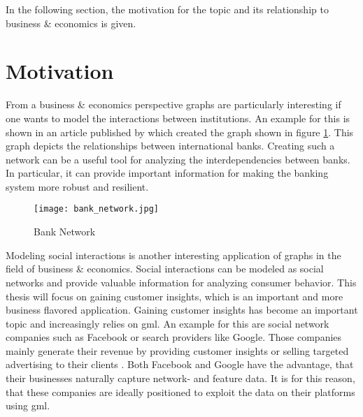 	\noindent In the following section, the motivation for the topic and its
	relationship to business \& economics is given. 

	\section{Motivation}

	\noindent From a business \& economics perspective graphs are particularly
	interesting if one wants to model the interactions between institutions. An 
	example for this is shown in an article published by 
	\cite{schweitzer2009economic} which created the graph shown in figure
	\ref{fig:bank_network}. This graph depicts the relationships between 
	international banks. Creating such a network can be a useful tool for 
	analyzing the interdependencies between banks. In particular, it can 
	provide important information for making the banking system more robust and 
	resilient. 

	\begin{figure}[h]
		\centering
		\texttt{[image: bank\_network.jpg]}
		\caption{Bank Network}
		\cite[p. 424]{schweitzer2009economic}
		\label{fig:bank_network}
	\end{figure} 

	\noindent Modeling social interactions is another interesting application
	of graphs in the field of business \& economics. Social interactions can be
	modeled as social networks and provide valuable information for analyzing
	consumer behavior. This thesis will focus on gaining customer insights,
	which is an important and more business flavored application. Gaining
	customer insights has become an important topic and increasingly relies on
	\acs{gml}. An example for this are social network companies 
	such as Facebook or search providers like Google. Those companies mainly 
	generate their revenue by providing customer insights or selling targeted 
	advertising to their clients \citep{Facebook2021,Alphabet2021}. Both 
	Facebook and Google have the advantage, that their businesses naturally 
	capture network- and feature data. It is for this reason, that these
	companies are ideally positioned to exploit the data on their platforms
	using \acs{gml}. \\


